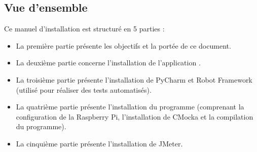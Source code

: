 \newpage
\subsection{Vue d'ensemble} %
Ce manuel d'installation est structuré en 5 parties :
\begin{itemize} 
    \item La première partie présente les objectifs et la portée de ce document.
    \item La deuxième partie concerne l'installation de l'application {\nomApplication}.
    \item La troisième partie présente l'installation de PyCharm et Robot Framework (utilisé pour réaliser des tests automatisés).
    \item La quatrième partie présente l'installation du programme {\nomLogiciel} (comprenant la configuration de la Raspberry Pi, l'installation de CMocka et la compilation du programme). 
    \item La cinquième partie présente l'installation de JMeter.
\end{itemize}
\newpage